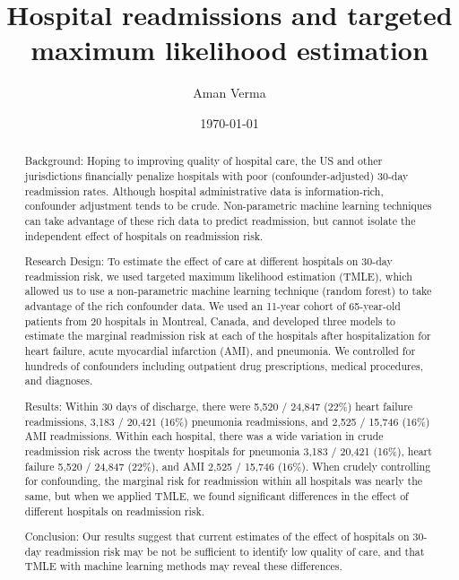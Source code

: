 \documentclass[]{article}\usepackage[]{graphicx}\usepackage[]{color}
\begin{document}
\title{Hospital readmissions and targeted maximum likelihood estimation}
\author{Aman Verma}
\date{\today}

\begin{abstract}







Background: Hoping to improving quality of hospital care, the US and other jurisdictions financially penalize hospitals with poor (confounder-adjusted) 30-day readmission rates. Although hospital administrative data is information-rich, confounder adjustment tends to be crude. Non-parametric machine learning techniques can take advantage of these rich data to predict readmission, but cannot isolate the independent effect of hospitals on readmission risk.

Research Design: To estimate the effect of care at different hospitals on 30-day readmission risk, we used targeted maximum likelihood estimation (TMLE), which allowed us to use a non-parametric machine learning technique (random forest) to take advantage of the rich confounder data. We used an 11-year cohort of 65-year-old patients from 20 hospitals in Montreal, Canada, and developed three models to estimate the marginal readmission risk at each of the hospitals after hospitalization for heart failure, acute myocardial infarction (AMI), and pneumonia. We controlled for hundreds of confounders including outpatient drug prescriptions, medical procedures, and diagnoses.

Results: Within 30 days of discharge, there were 5,520 / 24,847 (22\%) heart failure readmissions, 3,183 / 20,421 (16\%) pneumonia readmissions, and 2,525 / 15,746 (16\%) AMI readmissions. Within each hospital, there was a wide variation in crude readmission risk across the twenty hospitals for pneumonia 3,183 / 20,421 (16\%), heart failure 5,520 / 24,847 (22\%), and AMI 2,525 / 15,746 (16\%). When crudely controlling for confounding, the marginal risk for readmission within all hospitals was nearly the same, but when we applied TMLE, we found significant differences in the effect of different hospitals on readmission risk.

Conclusion: Our results suggest that current estimates of the effect of hospitals on 30-day readmission risk may be not be sufficient to identify low quality of care, and that TMLE with machine learning methods may reveal these differences.

\end{abstract}
\end{document}
